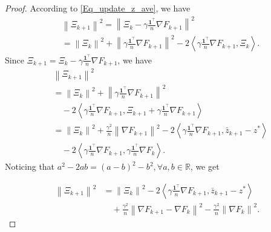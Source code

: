 \documentclass[letterpaper, 10 pt, conference]{ieeeconf}
\begin{document}
\begin{proof}
According to \eqref{Eq_update_z_ave}, we have
\begin{equation*}
\begin{aligned}
&\left\| \varXi _{k+1} \right\| ^2
=\left\| \varXi _k-\gamma \frac{\mathbf{1}^{\top}}{n}\nabla F_{k+1} \right\| ^2
\\
&=\left\| \varXi _k \right\| ^2+\left\| \gamma \frac{\mathbf{1}^{\top}}{n}\nabla F_{k+1} \right\| ^2-2\left< \gamma \frac{\mathbf{1}^{\top}}{n}\nabla F_{k+1}, \varXi _k \right> .
\end{aligned}
\end{equation*}
Since $\varXi _{k+1}=\varXi _k-\gamma \frac{\mathbf{1}^{\top}}{n}\nabla F_{k+1}$, we have
\begin{equation*}
\begin{aligned}
&\left\| \varXi _{k+1} \right\| ^2
\\
&=\left\| \varXi _k \right\| ^2+\left\| \gamma \frac{\mathbf{1}^{\top}}{n}\nabla F_{k+1} \right\| ^2
\\
&\quad-2\left< \gamma \frac{\mathbf{1}^{\top}}{n}\nabla F_{k+1}, \varXi _{k+1}+\gamma \frac{\mathbf{1}^{\top}}{n}\nabla F_{k+1} \right> 
\\
&=\left\| \varXi _k \right\| ^2+\frac{\gamma ^2}{n}\left\| \nabla F_{k+1} \right\| ^2-2\left< \gamma \frac{\mathbf{1}^{\top}}{n}\nabla F_{k+1},\bar{z}_{k+1}-z^* \right> 
\\
&\quad-2\left< \gamma \frac{\mathbf{1}^{\top}}{n}\nabla F_{k+1},\gamma \frac{\mathbf{1}^{\top}}{n}\nabla F_k \right>.
\end{aligned}
\end{equation*}
Noticing that $a^2-2ab=\left( a-b \right) ^2-b^2, \forall a,b\in \mathbb{R} $, we get

\begin{equation}\label{Eq_Desc_1}
\begin{aligned}
\left\| \varXi _{k+1} \right\| ^2
&=\left\| \varXi _k \right\| ^2-2\left< \gamma \frac{\mathbf{1}^{\top}}{n}\nabla F_{k+1},\bar{z}_{k+1}-z^* \right> 
\\
&\quad  +\frac{\gamma ^2}{n}\left\| \nabla F_{k+1}-\nabla F_k \right\| ^2-\frac{\gamma ^2}{n}\left\| \nabla F_k \right\| ^2.
\end{aligned}
\end{equation}


\end{proof}
\end{document}
